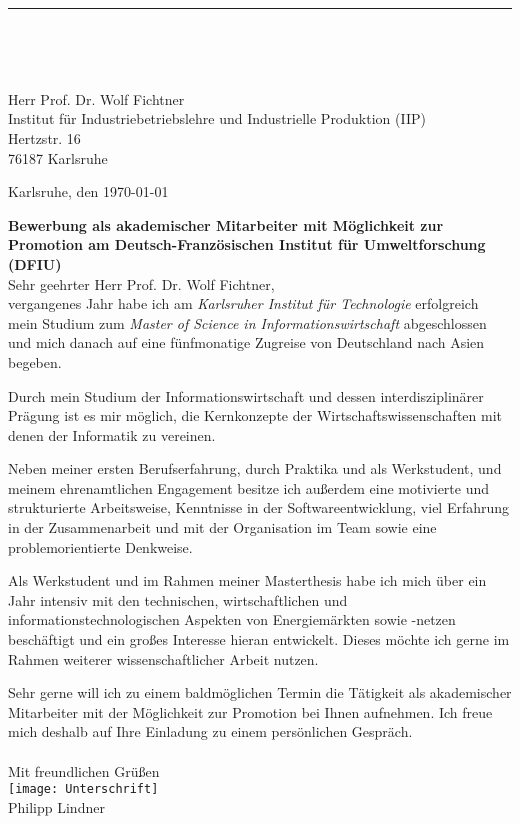 \documentclass[sans,11pt,a4paper]{moderncv}
\makeatletter
\renewcommand*{\makecvtitle}{%
  \recomputecvlengths%
  \makecvfooter%
  \newbox{\makecvtitlepicturebox}%
  \savebox{\makecvtitlepicturebox}{%
    \ifthenelse{\isundefined{\@photo}}%
      {
        \@initializelength{\makecvtitlepicturewidth}%
        \settowidth{\makecvtitlepicturewidth}{0pt}%
      }%
      {%
       \setlength\fboxrule{\@photoframewidth}%
       \ifdim\@photoframewidth=0pt%
         \setlength{\fboxsep}{0pt}\fi%
       {\color{color1}\framebox{\texttt{[image: \\@photo]}}}}
        \@initializelength{\makecvtitlepicturewidth}%
        \settowidth{\makecvtitlepicturewidth}{\usebox{\makecvtitlepicturebox}}%
      }%

 {   \raggedright\namefont{\color{color2}\MakeLowercase{\@firstname}}\color{color1}\MakeLowercase{\@familyname}}%
    \hfill\usebox{\makecvtitlepicturebox}%
\\[-.35em]%
  {\color{color2}\rule{\textwidth}{.25ex}}%
  \ifthenelse{\equal{\@title}{}}{}{\\[1.25em]\null\hfill\titlestyle{\@title}}\\[0.0em]%
  \ifthenelse{\isundefined{\@quote}}%
    {}%
    {{\null\hfill\begin{minipage}{\quotewidth}\centering\quotestyle{\@quote}\end{minipage}\hfill\null\\[2.5em]}}%
  \par}%
\makeatother
\begin{document}
\vspace*{2.10cm}
\makecvtitle
\linespread {0.9}
Herr Prof. Dr. Wolf Fichtner\\
Institut für Industriebetriebslehre und Industrielle Produktion (IIP)\\
Hertzstr. 16\\
76187 Karlsruhe
\linespread {1.175}
\vspace*{1.5cm}

\begin{flushright}
	Karlsruhe, den \today
\end{flushright}

\textbf{Bewerbung als akademischer Mitarbeiter mit Möglichkeit zur Promotion am Deutsch-Französischen Institut für Umweltforschung (DFIU)} \\

Sehr geehrter Herr Prof. Dr. Wolf Fichtner,\\


vergangenes Jahr habe ich am \textit{Karlsruher Institut für Technologie} erfolgreich mein Studium zum \textit{Master of Science in Informationswirtschaft} abgeschlossen und mich danach auf eine fünfmonatige Zugreise von Deutschland nach Asien begeben.

Durch mein Studium der Informationswirtschaft und dessen interdisziplinärer Prägung ist es mir möglich, die Kernkonzepte der Wirtschaftswissenschaften mit denen der Informatik zu vereinen.


Neben meiner ersten Berufserfahrung, durch Praktika und als Werkstudent, und meinem ehrenamtlichen Engagement besitze ich außerdem eine motivierte und strukturierte Arbeitsweise, Kenntnisse in der Softwareentwicklung,
viel Erfahrung in der Zusammenarbeit und mit der Organisation im Team sowie eine problemorientierte Denkweise.

Als Werkstudent und im Rahmen meiner Masterthesis habe ich mich über ein Jahr intensiv mit den technischen,
wirtschaftlichen und informationstechnologischen Aspekten von Energiemärkten sowie -netzen beschäftigt und
ein großes Interesse hieran entwickelt. Dieses möchte ich gerne im Rahmen weiterer wissenschaftlicher Arbeit nutzen.

Sehr gerne will ich zu einem baldmöglichen Termin die Tätigkeit als akademischer Mitarbeiter mit der Möglichkeit zur Promotion bei Ihnen aufnehmen. Ich freue mich deshalb auf Ihre Einladung zu einem persönlichen Gespräch.\\\\

Mit freundlichen Grüßen\\
\texttt{[image: Unterschrift]} 
\\Philipp Lindner

\closesection{}                   %
\end{document}
